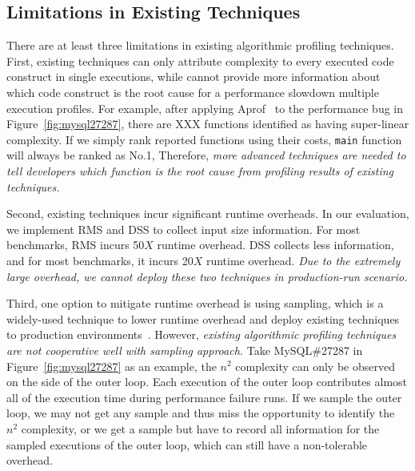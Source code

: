 \subsection{Limitations in Existing Techniques}
\label{subsec:existing}


%
There are at least three limitations in existing algorithmic profiling techniques. 
%
First, existing techniques can only 
attribute complexity to every executed code construct
in single executions, 
while cannot provide more information about 
which code construct is the root cause 
for a performance slowdown  multiple 
execution profiles. 
For example, after applying Aprof~\cite{Aprof1,Aprof2} 
to the performance bug in Figure~\ref{fig:mysql27287}, 
there are {\color{red} XXX} functions identified 
as having super-linear complexity. 
If we simply rank reported functions using their costs, 
\texttt{main} function will always be ranked as No.1,
Therefore, \emph{
more advanced techniques are needed to tell developers 
which function is the root cause from profiling results of existing techniques. 
}


Second, existing techniques incur significant runtime overheads. 
In our evaluation, we implement RMS and DSS to collect input size information. 
For most benchmarks, RMS incurs 50$X$ runtime overhead. 
DSS collects less information, and for most benchmarks, it incurs 20$X$ runtime overhead. 
\emph{Due to the extremely large overhead, 
we cannot deploy these two techniques in production-run scenario. }


Third, one option to mitigate runtime overhead is using
sampling, which is a widely-used technique to lower runtime overhead 
and deploy existing techniques to production 
environments~\cite{SongOOPSLA2014,liblit03,liblit05,CCI}. 
%
However, \emph{existing algorithmic profiling techniques are not cooperative well with
sampling approach.} 
Take MySQL\#27287 in Figure~\ref{fig:mysql27287} as an example,
the $n^2$ complexity can only be observed on the side of the outer loop. 
Each execution of the outer loop contributes almost all of 
the execution time during performance failure runs. 
If we sample the outer loop, 
we may not get any sample and thus miss the opportunity to 
identify the $n^2$ complexity, or we get a sample but have to 
record all 
information for the sampled executions of the outer loop, 
which can still  have a non-tolerable overhead. 


